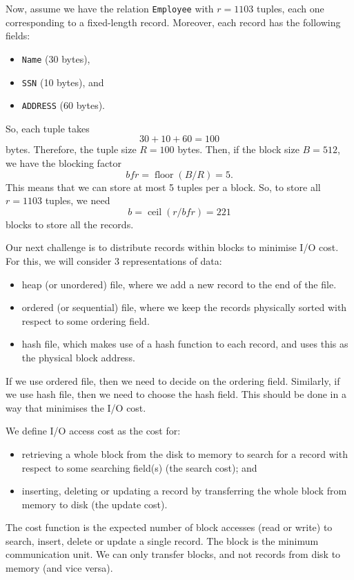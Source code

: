 \documentclass[a4paper, openany]{memoir}
\begin{document}
Now, assume we have the relation \texttt{Employee} with $r = 1103$ tuples, each one corresponding to a fixed-length record. Moreover, each record has the following fields:
\begin{itemize}
    \item \texttt{Name} (30 bytes),
    \item \texttt{SSN} (10 bytes), and
    \item \texttt{ADDRESS} (60 bytes).
\end{itemize}
So, each tuple takes
\[30 + 10 + 60 = 100\]
bytes. Therefore, the tuple size $R = 100$ bytes. Then, if the block size $B = 512$, we have the blocking factor
\[\textit{bfr} = \operatorname{floor}(B/R) = 5.\]
This means that we can store at most 5 tuples per a block. So, to store all $r = 1103$ tuples, we need
\[b = \operatorname{ceil}(r/\textit{bfr}) = 221\]
blocks to store all the records.

Our next challenge is to distribute records within blocks to minimise I/O cost. For this, we will consider 3 representations of data:
\begin{itemize}
    \item heap (or unordered) file, where we add a new record to the end of the file.
    \item ordered (or sequential) file, where we keep the records physically sorted with respect to some ordering field.
    \item hash file, which makes use of a hash function to each record, and uses this as the physical block address.
\end{itemize}
If we use ordered file, then we need to decide on the ordering field. Similarly, if we use hash file, then we need to choose the hash field. This should be done in a way that minimises the I/O cost.

We define I/O access cost as the cost for:
\begin{itemize}
    \item retrieving a whole block from the disk to memory to search for a record with respect to some searching field(s) (the search cost); and
    \item inserting, deleting or updating a record by transferring the whole block from memory to disk (the update cost).
\end{itemize}
The cost function is the expected number of block accesses (read or write) to search, insert, delete or update a single record. The block is the minimum communication unit. We can only transfer blocks, and not records from disk to memory (and vice versa).
\end{document}
